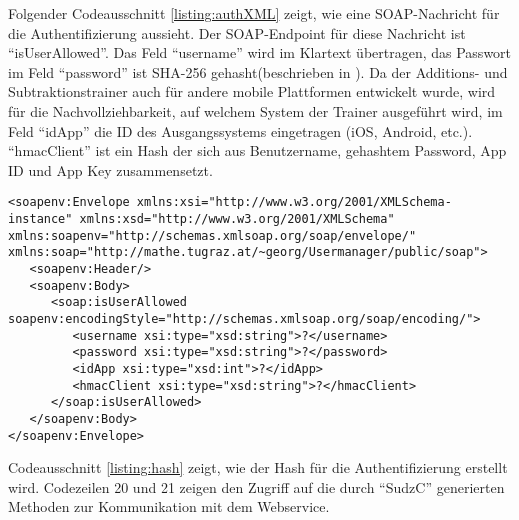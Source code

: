 Folgender Codeausschnitt \ref{listing:authXML} zeigt, wie eine SOAP-Nachricht für die Authentifizierung aussieht. Der 
SOAP-Endpoint für diese Nachricht ist \enquote{isUserAllowed}. Das Feld \enquote{username} wird im Klartext 
übertragen, das Passwort im Feld \enquote{password} ist SHA-256 gehasht(beschrieben in \cite{NSA2001}). 
Da der Additions- und Subtraktionstrainer auch für andere mobile Plattformen entwickelt wurde, wird für
die Nachvollziehbarkeit, auf welchem System der Trainer ausgeführt wird, im Feld \enquote{idApp} die
ID des Ausgangssystems eingetragen (iOS, Android, etc.). \enquote{hmacClient} ist ein Hash der sich aus Benutzername, gehashtem Password, App ID und App Key zusammensetzt.
\begin{lstlisting}[caption=SOAP XML Nachricht zur Benutzer Authentifizierung, label=listing:authXML]
<soapenv:Envelope xmlns:xsi="http://www.w3.org/2001/XMLSchema-instance" xmlns:xsd="http://www.w3.org/2001/XMLSchema" xmlns:soapenv="http://schemas.xmlsoap.org/soap/envelope/" xmlns:soap="http://mathe.tugraz.at/~georg/Usermanager/public/soap">
   <soapenv:Header/>
   <soapenv:Body>
      <soap:isUserAllowed soapenv:encodingStyle="http://schemas.xmlsoap.org/soap/encoding/">
         <username xsi:type="xsd:string">?</username>
         <password xsi:type="xsd:string">?</password>
         <idApp xsi:type="xsd:int">?</idApp>
         <hmacClient xsi:type="xsd:string">?</hmacClient>
      </soap:isUserAllowed>
   </soapenv:Body>
</soapenv:Envelope>\end{lstlisting} 
Codeausschnitt \ref{listing:hash} zeigt, wie der Hash für die Authentifizierung erstellt wird. Codezeilen
20 und 21 zeigen den Zugriff auf die durch \enquote{SudzC} generierten Methoden zur Kommunikation mit 
dem Webservice.
